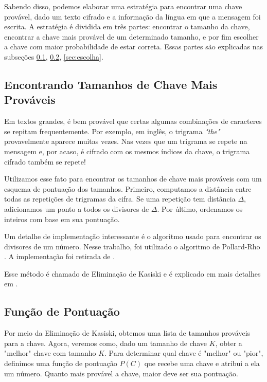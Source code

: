 \documentclass[conference]{IEEEtran}
\begin{document}
Sabendo disso, podemos elaborar uma estratégia para encontrar uma chave
provável, dado um texto cifrado e a informação da língua em que a mensagem foi
escrita. A estratégia é dividida em três partes: encontrar o tamanho da chave,
encontrar a chave mais provável de um determinado tamanho, e por fim escolher a
chave com maior probabilidade de estar correta. Essas partes são explicadas nas
subseções \ref{sec:tamanhos}, \ref{sec:pontuacao}, \ref{sec:escolha}.

\subsection{Encontrando Tamanhos de Chave Mais Prováveis}
\label{sec:tamanhos}

Em textos grandes, é bem provável que certas algumas combinações de caracteres
se repitam frequentemente. Por exemplo, em inglês, o trigrama \textit{"the"}
provavelmente aparece muitas vezes. Nas vezes que um trigrama se repete na
mensagem e, por acaso, é cifrado com os mesmos índices da chave, o trigrama
cifrado também se repete!

Utilizamos esse fato para encontrar os tamanhos de chave mais prováveis com um
esquema de pontuação dos tamanhos. Primeiro, computamos a distância entre todas
as repetições de trigramas da cifra. Se uma repetição tem distância $\Delta $,
adicionamos um ponto a todos os divisores de $\Delta $. Por último, ordenamos os
inteiros com base em sua pontuação.

Um detalhe de implementação interessante é o algoritmo usado para encontrar os
divisores de um número. Nesse trabalho, foi utilizado o algoritmo de Pollard-Rho
\cite{pollard-rho}. A implementação foi retirada de \cite{pollard-rho-tiago}.

Esse método é chamado de Eliminação de Kasiski e é explicado em mais detalhes em
\cite{kasiski}.

\subsection{Função de Pontuação}
\label{sec:pontuacao}
Por meio da Eliminação de Kasiski, obtemos uma lista de tamanhos prováveis para
a chave. Agora, veremos como, dado um tamanho de chave $K$, obter a "melhor"
chave com tamanho $K$. Para determinar qual chave é "melhor" ou "pior",
definimos uma função de pontuação $P(C)$ que recebe uma chave e atribui a ela um
número. Quanto mais provável a chave, maior deve ser sua pontuação. 
\end{document}

